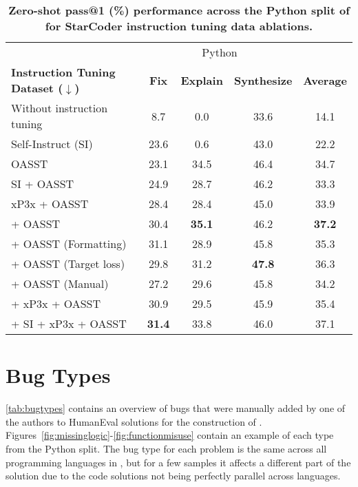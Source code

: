 \begin{table*}[htbp]
    \centering
\begin{tabular}{l|ccc|c}
    \toprule
    & \multicolumn{3}{c|}{\eval{} Python} & \\
    \textbf{Instruction Tuning Dataset ($\downarrow$)} & \textbf{Fix} & \textbf{Explain} & \textbf{Synthesize} & \textbf{Average} \\
    \midrule
Without instruction tuning & 8.7 & 0.0 & 33.6 & 14.1 \\    
    \midrule
    Self-Instruct (SI) & 23.6 & 0.6 & 43.0 & 22.2 \\
    OASST & 23.1 & 34.5 & 46.4 & 34.7 \\
    SI + OASST & 24.9 & 28.7 & 46.2 & 33.3 \\
    xP3x + OASST & 28.4 & 28.4 & 45.0 & 33.9 \\
    \dataft{} + OASST & 30.4 & \textbf{35.1} & 46.2 & \textbf{37.2} \\
    \dataft{} + OASST (Formatting) & 31.1 & 28.9 & 45.8 & 35.3  \\
    \dataft{} + OASST (Target loss) & 29.8 & 31.2 & \textbf{47.8} & 36.3 \\
    \dataft{} + OASST (Manual) & 27.2 & 29.6 & 45.8 & 34.2 \\
    \dataft{} + xP3x + OASST & 30.9 & 29.5 & 45.9 & 35.4 \\
    \dataft{} + SI + xP3x + OASST & \textbf{31.4} & 33.8 & 46.0 & 37.1 \\
    \bottomrule
    \end{tabular}
\caption{\textbf{Zero-shot pass@1 (\%) performance across the Python split of \eval{} for StarCoder instruction tuning data ablations.}}
    \label{tab:ablations}
\end{table*}

\FloatBarrier


\section{\evalf{} Bug Types}
\label{sec:bugs}

\autoref{tab:bugtypes} contains an overview of bugs that were manually added by one of the authors to HumanEval solutions for the construction of \evalf{}. Figures~\ref{fig:missinglogic}-\ref{fig:functionmisuse} contain an example of each type from the Python split. The bug type for each problem is the same across all programming languages in \evalf{}, but for a few samples it affects a different part of the solution due to the code solutions not being perfectly parallel across languages.


